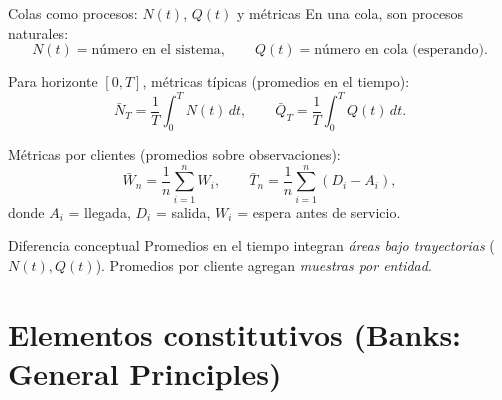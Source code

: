 \documentclass[aspectratio=1610, 9pt]{beamer}
\begin{document}
\begin{frame}{Colas como procesos: $N(t)$, $Q(t)$ y métricas}
\small
En una cola, son procesos naturales:
\[
N(t)=\text{número en el sistema},\qquad
Q(t)=\text{número en cola (esperando)}.
\]

Para horizonte $[0,T]$, métricas típicas (promedios en el tiempo):
\[
\bar{N}_T=\frac{1}{T}\int_0^T N(t)\,dt,\qquad
\bar{Q}_T=\frac{1}{T}\int_0^T Q(t)\,dt.
\]

Métricas por clientes (promedios sobre observaciones):
\[
\bar{W}_n=\frac{1}{n}\sum_{i=1}^n W_i,\qquad
\bar{T}_n=\frac{1}{n}\sum_{i=1}^n (D_i-A_i),
\]
donde $A_i$ = llegada, $D_i$ = salida, $W_i$ = espera antes de servicio.

\vspace{6pt}
\begin{alertblock}{Diferencia conceptual}
Promedios en el tiempo integran \emph{áreas bajo trayectorias} ($N(t),Q(t)$). Promedios por cliente agregan \emph{muestras por entidad}.
\end{alertblock}
\end{frame}

\section{Elementos constitutivos (Banks: General Principles)}
\end{document}

